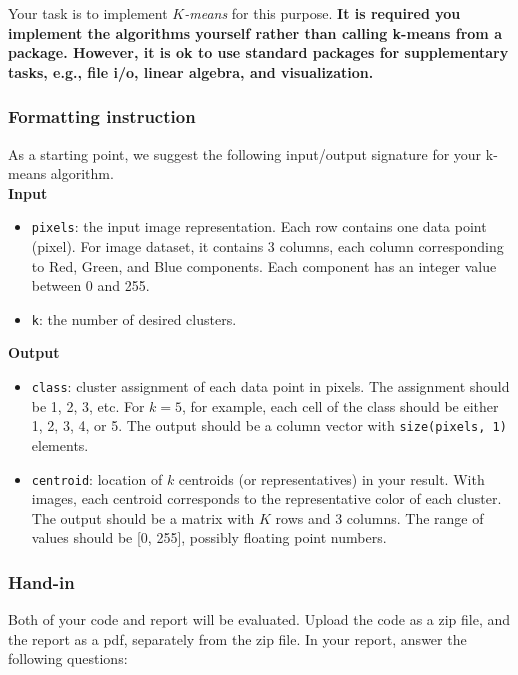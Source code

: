 \documentclass[twoside,10pt]{article}
\begin{document}
Your task is to implement \emph{$K$-means} for this purpose.  {\bf It is required you implement the algorithms yourself rather than calling k-means from a package. However, it is ok to use standard packages for supplementary tasks, e.g., file i/o, linear algebra, and visualization.} 


\subsubsection*{Formatting instruction}

As a starting point, we suggest the following input/output signature for your k-means algorithm.\\

\textbf{Input}
\begin{itemize}
  \item \texttt{pixels}: the input image representation. Each row contains one data point (pixel). For image dataset, it contains 3 columns, each column corresponding to Red, Green, and Blue components. Each component has an integer value between 0 and 255.
  \item \texttt{k}: the number of desired clusters.
\end{itemize}

\textbf{Output}
\begin{itemize}
  \item \texttt{class}: cluster assignment of each data point in pixels. The assignment should be 1, 2, 3, etc. For $k = 5$, for example, each cell of the class should be either 1, 2, 3, 4, or 5. The output should be a column vector with \texttt{size(pixels, 1)} elements.
  \item \texttt{centroid}: location of $k$ centroids (or representatives) in your result. With images, each centroid corresponds to the representative color of each cluster. The output should be a matrix with $K$ rows and 3 columns. The range of values should be [0, 255], possibly floating point numbers.
\end{itemize}

\subsubsection*{Hand-in}
Both of your code and report will be evaluated. Upload the code as a zip file, and the report as a pdf, separately from the zip file. In your report, answer the following questions:
\end{document}
